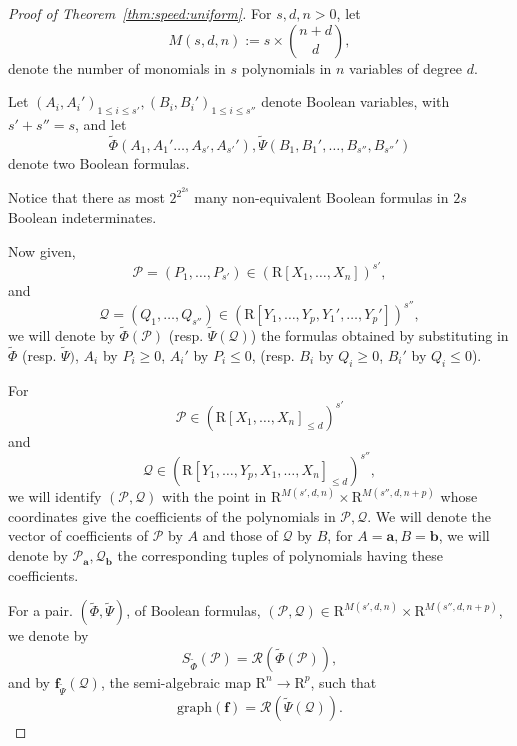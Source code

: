 \documentclass{amsart}[10pts]
\theoremstyle{definition}
\theoremstyle{remark}
\theoremstyle{observation}
\numberwithin{equation}{section}
\newcommand {\R} {\mathrm{R}}
\newcommand {\RR} {{\mathcal R}}
\begin{document}
\begin{proof}[Proof of Theorem~\ref{thm:speed:uniform}]
For $s,d,n > 0$, let
\[
M(s,d,n) :=  s \times \binom{n + d}{d},
\]
denote the number of monomials in $s$ polynomials in $n$ variables of degree $d$.

Let $(A_i,A_i')_{1 \leq i \leq s'}, (B_i,B_i')_{1 \leq i \leq s''}$ denote Boolean variables, 
with $s' + s''= s$, and let 
\[
\widetilde{\Phi}(A_1,A_1'\ldots,A_{s'},A_{s'}'), \widetilde{\Psi}(B_1,B_1',\ldots,B_{s''},B_{s''}')
\]
denote two Boolean formulas.


Notice that there as most $2^{2^{2s}}$ many non-equivalent Boolean formulas in $2s$ Boolean indeterminates.


Now given, 
\[
\mathcal{P} = (P_1,\ldots,P_{s'}) \in (\R[X_1,\ldots,X_n])^{s'},
\]
and 
\[
\mathcal{Q} = (Q_1,\ldots,Q_{s''}) \in (\R[Y_1,\ldots,Y_p,Y_1',\ldots,Y_p'])^{s''},
\]
we will denote by $\widetilde{\Phi}(\mathcal{P})$ (resp.
$\widetilde{\Psi}(\mathcal{Q})$) the formulas obtained by substituting 
in $\widetilde{\Phi}$ (resp. $\widetilde{\Psi})$,
$A_i$ by $P_i \geq 0$, $A_i'$ by $P_i \leq 0$, (resp. $B_i$ by $Q_i \geq 0$, $B_i'$ by $Q_i \leq 0$).

For 
\[
\mathcal{P} \in (\R[X_1,\ldots,X_n]_{\leq d})^{s'}
\]
and 
\[
\mathcal{Q} \in (\R[Y_1,\ldots,Y_p,X_1,\ldots,X_n]_{\leq d})^{s''},
\]
we will identify $(\mathcal{P},\mathcal{Q})$ with the point in 
$\R^{M(s',d,n)}\times \R^{M(s'',d,n+p)}$ whose coordinates give the coefficients of the polynomials in $\mathcal{P},\mathcal{Q}$.
We will denote the vector of coefficients of $\mathcal{P}$ by
$A$ and those of $\mathcal{Q}$ by $B$, for $A = \mathbf{a}, B = \mathbf{b}$, we will denote by 
$\mathcal{P}_{\mathbf{a}},\mathcal{Q}_{\mathbf{b}}$ the corresponding tuples of polynomials
having these coefficients.

For a pair. $(\widetilde{\Phi},\widetilde{\Psi})$, of Boolean formulas, 
$(\mathcal{P},\mathcal{Q}) \in \R^{M(s',d,n)}\times \R^{M(s'',d,n+p)}$,
we denote by 
\[
S_{\widetilde{\Phi}}(\mathcal{P}) = \RR(\widetilde{\Phi}(\mathcal{P})),
\]
and 
by $\mathbf{f}_{\widetilde{\Psi}}(\mathcal{Q})$, the semi-algebraic map
$\R^n \rightarrow \R^p$, such that
\[
\mathrm{graph}(\mathbf{f}) = \RR(\widetilde{\Psi}(\mathcal{Q})).
\]


\end{proof}
\end{document}
